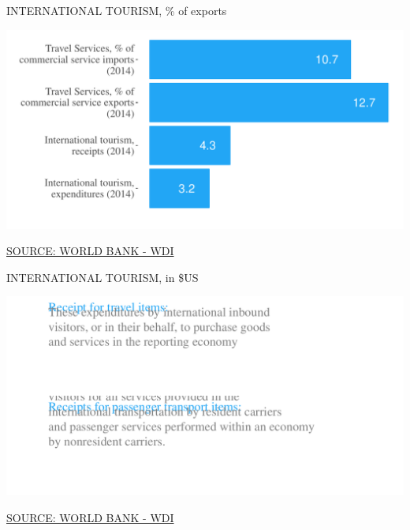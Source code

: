 \documentclass{article}\usepackage[]{graphicx}\usepackage[]{color}
\makeatletter
\def\maxwidth{ %
  \ifdim\Gin@nat@width>\linewidth
    \linewidth
  \else
    \Gin@nat@width
  \fi
}
\makeatother
\begin{document}
\begin{minipage}[c]{0.95\textwidth}
  \vspace{3ex}
  \begin{minipage}[c]{0.5\textwidth}  
    \hspace{4ex}\small{\textcolor[HTML]{818181}{INTERNATIONAL TOURISM, \% of exports}}
    \vspace{1ex}


{\centering \includegraphics[width=\maxwidth]{figure/bar1-1} 

}



    \hspace{4ex}\scriptsize{\href{NA}{\textcolor[HTML]{722FF5}{SOURCE: WORLD BANK - WDI}}}
  \end{minipage}
  \begin{minipage}[c]{0.5\textwidth} 
    \hspace{4ex}\small{\textcolor[HTML]{818181}{INTERNATIONAL TOURISM, in \$US}}
    \vspace{1ex}


{\centering \includegraphics[width=\maxwidth]{figure/text_box-1} 

}



    \hspace{4ex}\scriptsize{\href{NA}{\textcolor[HTML]{722FF5}{SOURCE: WORLD BANK - WDI}}}
  \end{minipage}
\end{minipage}      
\end{document}
